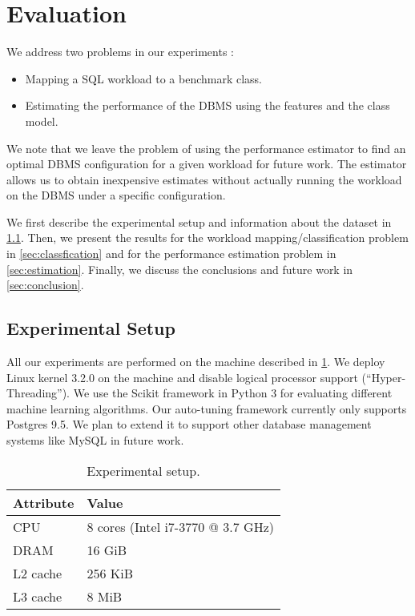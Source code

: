 \section{Evaluation} \label{sec:eval}

We address two problems in our experiments :
\begin{itemize}
	\item Mapping a SQL workload to a benchmark class.
	\item Estimating the performance of the DBMS using the features and the class
	model.
\end{itemize}

We note that we leave the problem of using the performance estimator to find
an optimal DBMS configuration for a given workload for future work. The
estimator allows us to obtain inexpensive estimates without actually running
the workload on the DBMS under a specific configuration.

We first describe the experimental setup and information about the dataset
in \cref{sec:setup}. Then, we present the results for the
workload mapping/classification problem in \cref{sec:classfication} and for the
performance estimation problem in \cref{sec:estimation}. Finally, we discuss
the conclusions and future work in \cref{sec:conclusion}.

\subsection{Experimental Setup}
\label{sec:setup}

All our experiments are performed on the machine described in \cref{tab:setup}.
We deploy Linux kernel 3.2.0 on the machine and disable logical processor
support (“Hyper-Threading”).
We use the Scikit \citep{scikit-learn} framework in Python 3 for
evaluating different machine learning algorithms.
Our auto-tuning framework currently only supports Postgres 9.5. We plan to
extend it to support other database management systems like MySQL in future
work.

\begin{table}
\centering
\small{
  \centering
  \begin{tabular}{l|l} 
	\toprule
   		Attribute &  Value  \\    
    \midrule
		CPU   &   8 cores (Intel i7-3770 @ 3.7 GHz)  \\
		DRAM   &  16 GiB  \\
		L2 cache  &  256 KiB  \\
		L3 cache  &  8 MiB  \\		
   \bottomrule
   \end{tabular}
 }
\caption{Experimental setup.}
\label{tab:setup}
\end{table}

